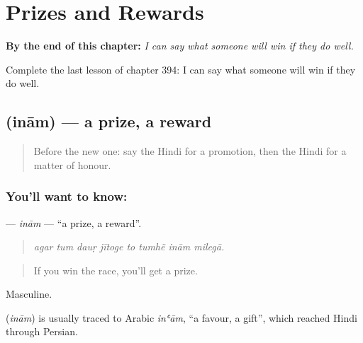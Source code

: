 
\chapter{Prizes and Rewards}
\label{ch:hi-prizes-and-rewards}

\begin{chapteropening}
\textbf{By the end of this chapter:} \emph{I can say what someone will win if they do well.}

Complete the last lesson of chapter 394: I can say what someone will win if they do well.
\end{chapteropening}

\section[\texorpdfstring{\hi{इनाम} (inām)}{इनाम (inām)}]{ (inām) — a prize, a reward}

\label{lesson:HI-C394-inam}



\begin{quote}
Before the new one: say the Hindi for a promotion, then the Hindi for a matter of honour.
\end{quote}

\subsection*{You'll want to know: }
\textbf{} — \emph{inām} — \textquotedblleft{}a prize, a reward\textquotedblright{}.

\begin{quote}
       
\end{quote}

\begin{quote}
\emph{agar tum dauṛ jītoge to tumhẽ inām milegā.}
\end{quote}

\begin{quote}
If you win the race, you'll get a prize.
\end{quote}

Masculine.

\begin{cousinweb}
\textbf{} (\emph{inām}) is usually traced to Arabic \emph{inʿām}, \textquotedblleft{}a favour, a gift\textquotedblright{}, which reached Hindi through Persian.
\end{cousinweb}

